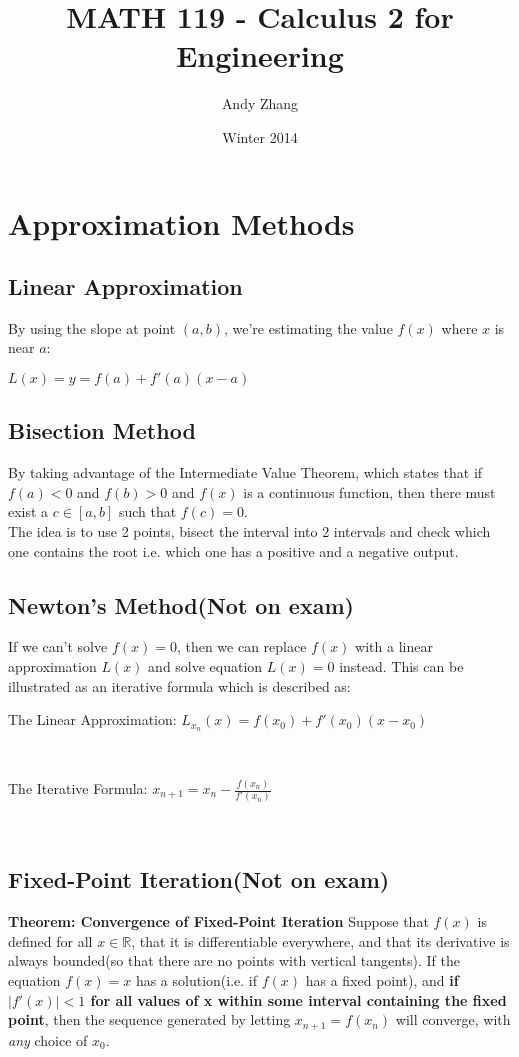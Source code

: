 \documentclass[12pt]{report}
\title{MATH 119 - Calculus 2 for Engineering}
\author{Andy Zhang}
\date{Winter 2014}
\begin{document}
\maketitle
\tableofcontents
\chapter{Approximation Methods}
	\section{Linear Approximation}
		By using the slope at point $(a,b)$, we're estimating the value $f(x)$ where $x$ is near $a$:\\
		\centerline{$L(x) = y = f(a) + f'(a)(x-a)$}
	\section{Bisection Method}
		By taking advantage of the Intermediate Value Theorem, which states that if $f(a) < 0$ and $f(b) > 0$ and $f(x)$ is a continuous function, then there must exist a $c \in [a,b]$ such that $f(c) = 0$. \\
		The idea is to use 2 points, bisect the interval into 2 intervals and check which one contains the root i.e. which one has a positive and a negative output.
	\section{Newton's Method(Not on exam)}
		If we can't solve $f(x) = 0$, then we can replace $f(x)$ with a linear approximation $L(x)$ and solve equation $L(x) = 0$ instead. This can be illustrated as an iterative formula which is described as:\\
		\centerline{The Linear Approximation: $L_{x_n}(x) = f(x_0) + f'(x_0)(x-x_0)$}\\
		\centerline{The Iterative Formula: $x_{n+1} = x_n - \frac{f(x_n)}{f'(x_n)}$}\\
	\section{Fixed-Point Iteration(Not on exam)}
		\textbf{Theorem: Convergence of Fixed-Point Iteration} Suppose that $f(x)$ is defined for all $x \in \mathbb{R}$, that it is differentiable everywhere, and that its derivative is always bounded(so that there are no points with vertical tangents). If the equation $f(x) = x$ has a solution(i.e. if $f(x)$ has a fixed point), and \textbf{if $|f'(x)| < 1$ for all values of x within some interval containing the fixed point}, then the sequence generated by letting $x_{n+1} = f(x_n)$ will converge, with \textit{any} choice of $x_0$. 
\end{document}
